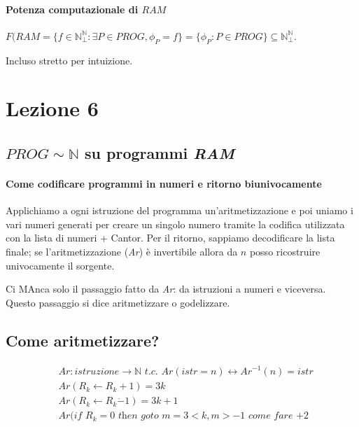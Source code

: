 \documentclass{article}
\begin{document}
\paragraph{Potenza computazionale di $\textit{RAM}$}
$F(\textit{RAM}=\{f \in \mathbb{N}^{\mathbb{N}}_{\perp}: \exists P \in \textit{PROG}, \phi_P=f\} = \{ \phi_{P}:P \in \textit{PROG} \} \subseteq \mathbb{N}^{\mathbb{N}}_{\perp}$.



Incluso stretto per intuizione.














\section{Lezione 6}
\subsection{$\textit{PROG} \sim \mathbb{N}$ su programmi \textit{RAM}}
\paragraph{Come codificare programmi in numeri e ritorno biunivocamente}
Applichiamo a ogni istruzione del programma un'aritmetizzazione e poi uniamo i vari numeri generati per creare un singolo numero tramite la codifica utilizzata con la lista di numeri + Cantor.
Per il ritorno, sappiamo decodificare la lista finale; se l'aritmetizzazione (\textit{Ar}) è invertibile allora da $n$ posso ricostruire univocamente il sorgente.



Ci MAnca solo il passaggio fatto da \textit{Ar}: da istruzioni a numeri e viceversa. Questo passaggio si dice aritmetizzare o godelizzare.
\subsection{Come aritmetizzare?}
\begin{displaymath}
	\begin{split}
		&\textit{Ar}: \textit{istruzione} \rightarrow \mathbb{N} \textit{ t.c. } \textit{Ar}(\textit{istr}=n) \leftrightarrow \textit{Ar}^{-1}(n)=\textit{istr} \\
		&\textit{Ar}(R_k \leftarrow R_k + 1)=3k \\
		&\textit{Ar}(R_k \leftarrow R_k \dot{-} 1)=3k+1 \\
		&\textit{Ar}(\textit{if }R_k = 0 \textit{ then goto }m =3<k,m>-1 \textit{ come fare +2} 
	\end{split}
\end{displaymath}
\end{document}
